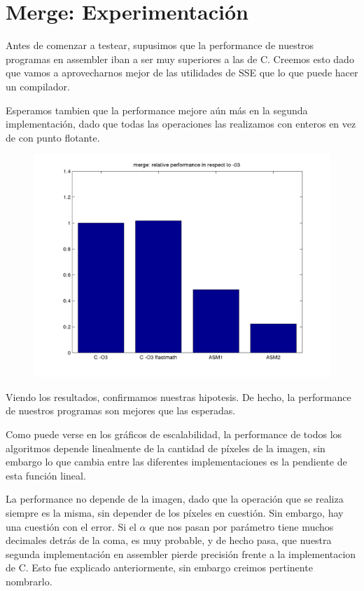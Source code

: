 \section*{Merge: Experimentación}

Antes de comenzar a testear, supusimos que la performance de nuestros programas en assembler iban a ser muy superiores a las de C. Creemos esto dado que vamos a aprovecharnos mejor de las utilidades de SSE que lo que puede hacer un compilador. 

Esperamos tambien que la performance mejore aún más en la segunda implementación, dado que todas las operaciones las realizamos con enteros en vez de con punto flotante.


\begin{figure}[!hbt] 
  \includegraphics[width=15cm]{merge-random-uniform-pixel-fixed-size_barchart.png}
	\centering
\end{figure}



Viendo los resultados, confirmamos nuestras hipotesis. De hecho, la performance de nuestros programas son mejores que las esperadas.

Como puede verse en los gráficos de escalabilidad, la performance de todos los algoritmos depende linealmente de la cantidad de píxeles de la imagen, sin embargo lo que cambia entre las diferentes implementaciones es la pendiente de esta función lineal.

La performance no depende de la imagen, dado que la operación que se realiza siempre es la misma, sin depender de los píxeles en cuestión.
Sin embargo, hay una cuestión con el error. Si el $\alpha$ que nos pasan por parámetro tiene muchos decimales detrás de la coma, es muy probable, y de hecho pasa, que nuestra segunda implementación en assembler pierde precisión frente a la implementacion de C. Esto fue explicado anteriormente, sin embargo creimos pertinente nombrarlo.


